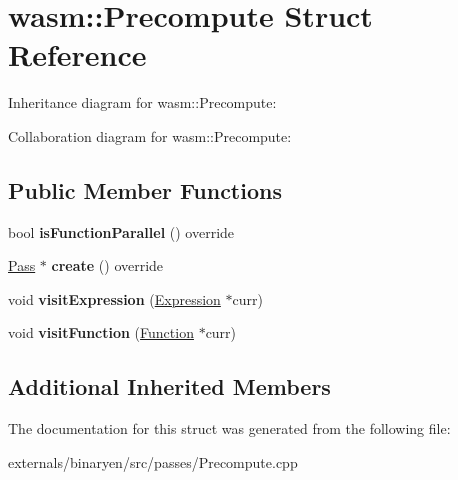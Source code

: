 \hypertarget{structwasm_1_1_precompute}{}\section{wasm\+:\+:Precompute Struct Reference}
\label{structwasm_1_1_precompute}


Inheritance diagram for wasm\+:\+:Precompute\+:


Collaboration diagram for wasm\+:\+:Precompute\+:
\subsection*{Public Member Functions}
\begin{DoxyCompactItemize}
\item 
\mbox{\label{structwasm_1_1_precompute_a27a4083c2aa1c4b07219918536c6e468}} 
bool {\bfseries is\+Function\+Parallel} () override
\item 
\mbox{\label{structwasm_1_1_precompute_a60fa952a082480d324842b7db7c9c648}} 
\mbox{\hyperlink{classwasm_1_1_pass}{Pass}} $\ast$ {\bfseries create} () override
\item 
\mbox{\label{structwasm_1_1_precompute_abf451232396a35ba8b0a3a5f60d2af41}} 
void {\bfseries visit\+Expression} (\mbox{\hyperlink{classwasm_1_1_expression}{Expression}} $\ast$curr)
\item 
\mbox{\label{structwasm_1_1_precompute_a2fa4d555ab2ca8d6fb8d24b9b2743d05}} 
void {\bfseries visit\+Function} (\mbox{\hyperlink{classwasm_1_1_function}{Function}} $\ast$curr)
\end{DoxyCompactItemize}
\subsection*{Additional Inherited Members}


The documentation for this struct was generated from the following file\+:\begin{DoxyCompactItemize}
\item 
externals/binaryen/src/passes/Precompute.\+cpp\end{DoxyCompactItemize}
